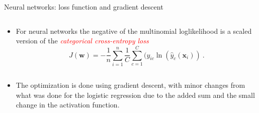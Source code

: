 \documentclass[10pt,ignorenonframetext,]{beamer}
\providecommand{\tightlist}{%
  \setlength{\itemsep}{0pt}\setlength{\parskip}{0pt}}
\begin{document}
\begin{frame}

\begin{block}{Neural networks: loss function and gradient descent}

\(~\)

\begin{itemize}
\tightlist
\item
  For neural networks the negative of the multinomial loglikelihood is a
  scaled version of the
  \emph{\textcolor{red}{categorical cross-entropy loss}}
  \[ J({\boldsymbol w})=-\frac{1}{n}\sum_{i=1}^n\frac{1}{C} \sum_{c=1}^C (y_{ic}\ln({\hat{y}_c({\boldsymbol x}_i)}) \ .\]
\end{itemize}

\(~\)

\begin{itemize}
\tightlist
\item
  The optimization is done using gradient descent, with minor changes
  from what was done for the logistic regression due to the added sum
  and the small change in the activation function.
\end{itemize}

\end{block}

\end{frame}
\end{document}
